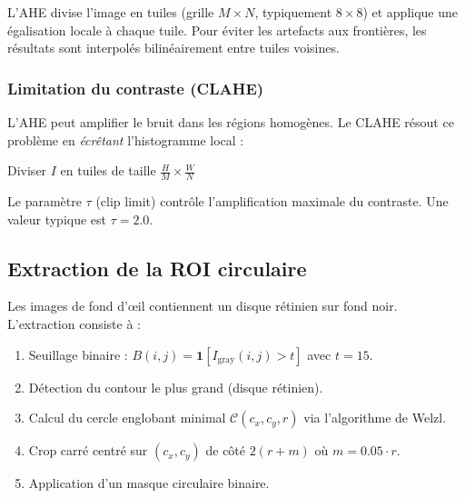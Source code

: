 \documentclass[11pt,a4paper]{article}
\begin{document}
L'AHE divise l'image en tuiles (grille $M \times N$, typiquement $8 \times 8$) et applique une égalisation locale à chaque tuile. Pour éviter les artefacts aux frontières, les résultats sont interpolés bilinéairement entre tuiles voisines.

\subsubsection{Limitation du contraste (CLAHE)}

L'AHE peut amplifier le bruit dans les régions homogènes. Le CLAHE résout ce problème en \emph{écrêtant} l'histogramme local :

\begin{algorithm}[H]
\DontPrintSemicolon
\SetAlgoLined
{}
Diviser $I$ en tuiles de taille $\frac{H}{M} \times \frac{W}{N}$\;
\caption{CLAHE}
\end{algorithm}

Le paramètre $\tau$ (clip limit) contrôle l'amplification maximale du contraste. Une valeur typique est $\tau = 2.0$.

\subsection{Extraction de la ROI circulaire}

Les images de fond d'œil contiennent un disque rétinien sur fond noir. L'extraction consiste à :

\begin{enumerate}
  \item Seuillage binaire : $B(i,j) = \mathbf{1}[I_{\text{gray}}(i,j) > t]$ avec $t=15$.
  \item Détection du contour le plus grand (disque rétinien).
  \item Calcul du cercle englobant minimal $\mathcal{C}(c_x, c_y, r)$ via l'algorithme de Welzl.
  \item Crop carré centré sur $(c_x, c_y)$ de côté $2(r + m)$ où $m = 0.05 \cdot r$.
  \item Application d'un masque circulaire binaire.
\end{enumerate}
\end{document}
